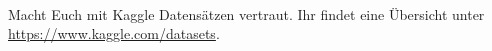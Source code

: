 \newcommand{\printpraesenzlsg}{false}
\newcommand{\printloesungen}{false}
\newcommand{\printbewertungen}{false}
\newcommand{\blattnummer}{1}



\iforiginal{}

	




\\
Macht Euch mit Kaggle Datensätzen vertraut. Ihr findet eine Übersicht unter \url{https://www.kaggle.com/datasets}. 

